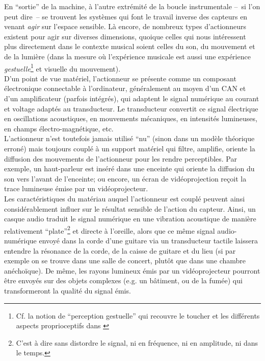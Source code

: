 \noindent En ``sortie'' de la machine, à l'autre extrémité de la boucle instrumentale --~si l'on peut dire~-- se trouvent les systèmes qui font le travail inverse des capteurs en venant \textit{agir} sur l'espace sensible. Là encore, de nombreux types d'actionneurs existent pour agir sur diverses dimensions, quoique celles qui nous intéressent plus directement dans le contexte musical soient celles du son, du mouvement et de la lumière (dans la mesure où l'expérience musicale est aussi une expérience \textit{gestuelle}\footnote{Cf. la notion de ``perception gestuelle'' qui recouvre le toucher et les différents aspects proprioceptifs dans \cite{cadoz_synthese_1981}} et visuelle du mouvement).\\
\indent D'un point de vue matériel, l'actionneur se présente comme un composant électronique connectable à l'ordinateur, généralement au moyen d'un \gls{CAN} et d'un amplificateur (parfois intégrés), qui adaptent le signal numérique au courant et voltage adaptés au transducteur. Le transducteur convertit ce signal électrique en oscillations acoustiques, en mouvements mécaniques, en intensités lumineuses, en champs électro-magnétique, etc.\\
\indent L'actionneur n'est toutefois jamais utilisé ``nu'' (sinon dans un modèle théorique erroné) mais toujours couplé à un support matériel qui filtre, amplifie, oriente la diffusion des mouvements de l'actionneur pour les rendre perceptibles. Par exemple, un haut-parleur est inséré dans une enceinte qui oriente la diffusion du son vers l'avant de l'enceinte; ou encore, un écran de vidéoprojection reçoit la trace lumineuse émise par un vidéoprojecteur.\\
\indent Les caractéristiques du matériau auquel l'actionneur est couplé peuvent ainsi considérablement influer sur le résultat sensible de l'action du capteur. Ainsi, un casque audio traduit le signal numérique en une vibration acoustique de manière relativement ``plate''\footnote{C'est à dire sans distordre le signal, ni en fréquence, ni en amplitude, ni dans le temps.} et directe à l'oreille, alors que ce même signal audio-numérique envoyé dans la corde d'une guitare via un transducteur tactile laissera entendre la résonance de la corde, de la caisse de guitare et du lieu (si par exemple on se trouve dans une salle de concert, plutôt que dans une chambre anéchoïque). De même, les rayons lumineux émis par un vidéoprojecteur pourront être envoyés sur des objets complexes (e.g. un bâtiment, ou de la fumée) qui transformeront la qualité du signal émis.\\
